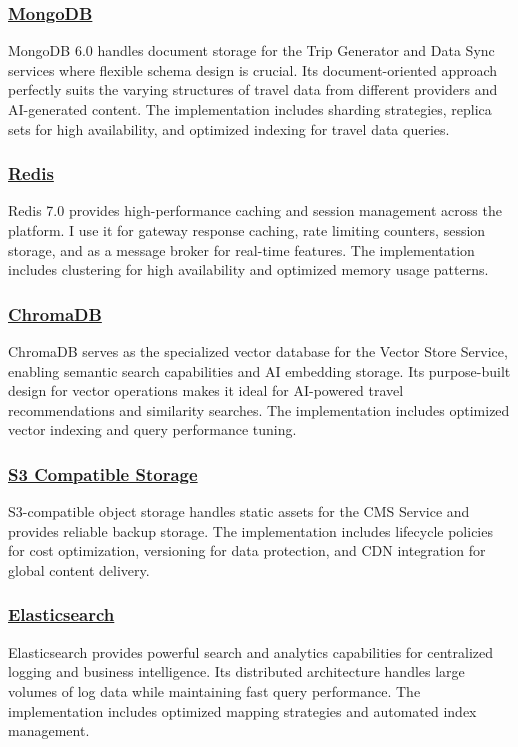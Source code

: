 \subsubsection*{\underline{MongoDB}}
MongoDB 6.0 handles document storage for the Trip Generator and Data Sync services where flexible schema design is crucial. Its document-oriented approach perfectly suits the varying structures of travel data from different providers and AI-generated content. The implementation includes sharding strategies, replica sets for high availability, and optimized indexing for travel data queries.

\subsubsection*{\underline{Redis}}
Redis 7.0 provides high-performance caching and session management across the platform. I use it for gateway response caching, rate limiting counters, session storage, and as a message broker for real-time features. The implementation includes clustering for high availability and optimized memory usage patterns.

\subsubsection*{\underline{ChromaDB}}
ChromaDB serves as the specialized vector database for the Vector Store Service, enabling semantic search capabilities and AI embedding storage. Its purpose-built design for vector operations makes it ideal for AI-powered travel recommendations and similarity searches. The implementation includes optimized vector indexing and query performance tuning.

\subsubsection*{\underline{S3 Compatible Storage}}
S3-compatible object storage handles static assets for the CMS Service and provides reliable backup storage. The implementation includes lifecycle policies for cost optimization, versioning for data protection, and CDN integration for global content delivery.

\subsubsection*{\underline{Elasticsearch}}
Elasticsearch provides powerful search and analytics capabilities for centralized logging and business intelligence. Its distributed architecture handles large volumes of log data while maintaining fast query performance. The implementation includes optimized mapping strategies and automated index management.

